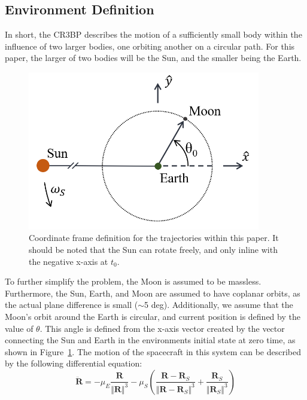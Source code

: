 \documentclass[letterpaper, paper,11pt]{AAS}	%
\begin{document}
\subsection*{Environment Definition}

In short, the CR3BP describes the motion of a sufficiently small body within the influence of two larger bodies, one orbiting another on a circular path. For this paper, the larger of two bodies will be the Sun, and the smaller being the Earth. 

\begin{figure}[h]
    \centering
    \includegraphics[width=4in]{./figs/diag_sunearth.png}
    \caption{Coordinate frame definition for the trajectories within this paper. It should be noted that the Sun can rotate freely, and only inline with the negative x-axis at \(t_0\).}
    \label{fig:sunearth}
\end{figure}

To further simplify the problem, the Moon is assumed to be massless. Furthermore, the Sun, Earth, and Moon are assumed to have coplanar orbits, as the actual plane difference is small (\(\sim\)5 deg). Additionally, we assume that the Moon's orbit around the Earth is circular, and current position is defined by the value of \(\theta\). This angle is defined from the x-axis vector created by the vector connecting the Sun and Earth in the environments initial state at zero time, as shown in Figure~\ref{fig:sunearth}. The motion of the spacecraft in this system can be described by the following differential equation:
\begin{equation}
    \ddot{\mathbf{R}} = -\mu_E\frac{ \mathbf{R} }{ \Vert\mathbf{R}\Vert^3 } - \mu_S\left( \frac{\mathbf{R} - \mathbf{R}_S}{\Vert\mathbf{R}-\mathbf{R}_S\Vert^3} + \frac{ \mathbf{R}_S }{ \Vert\mathbf{R}_S\Vert^3 } \right)
    \label{eq:EOM}
\end{equation}
\end{document}
